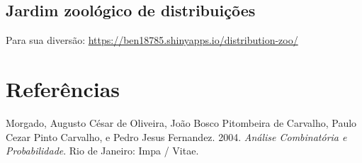 \documentclass[
  11pt]{report}
\newlength{\cslhangindent}
\newlength{\cslentryspacingunit} %
\newenvironment{CSLReferences}[2] %
 {%
  \setlength{\parindent}{0pt}
  \ifodd #1
  \let\oldpar\par
  \def\par{\hangindent=\cslhangindent\oldpar}
  \fi
  \setlength{\parskip}{#2\cslentryspacingunit}
 }%
 {}
\begin{document}
\hypertarget{jardim-zooluxf3gico-de-distribuiuxe7uxf5es}{%
\section{Jardim zoológico de distribuições}\label{jardim-zooluxf3gico-de-distribuiuxe7uxf5es}}

Para sua diversão: \url{https://ben18785.shinyapps.io/distribution-zoo/}

\hypertarget{referuxeancias}{%
\chapter*{Referências}\label{referuxeancias}}

\hypertarget{refs}{}
\begin{CSLReferences}{1}{0}
\leavevmode{}%
Morgado, Augusto César de Oliveira, João Bosco Pitombeira de Carvalho, Paulo Cezar Pinto Carvalho, e Pedro Jesus Fernandez. 2004. \emph{Análise Combinatória e Probabilidade}. {Rio de Janeiro}: {Impa / Vitae}.

\end{CSLReferences}
\end{document}

